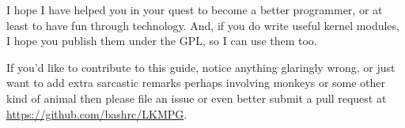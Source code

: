 \documentclass[11pt]{article}
\begin{document}
I hope I have helped you in your quest to become a better programmer, or at least to have fun through technology. And, if you do write useful kernel modules, I hope you publish them under the GPL, so I can use them too.

If you'd like to contribute to this guide, notice anything glaringly wrong, or just want to add extra sarcastic remarks perhaps involving monkeys or some other kind of animal then please file an issue or even better submit a pull request at \url{https://github.com/bashrc/LKMPG}.
\end{document}
